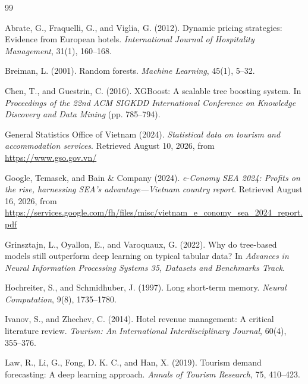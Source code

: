 \renewcommand{\bibname}{REFERENCES}

\begin{singlespace}
\begin{thebibliography}{99}
\setlength{\itemsep}{6pt}

Abrate, G., Fraquelli, G., and Viglia, G. (2012). Dynamic pricing strategies: Evidence from European hotels. \textit{International Journal of Hospitality Management}, 31(1), 160--168.

Breiman, L. (2001). Random forests. \textit{Machine Learning}, 45(1), 5--32.

Chen, T., and Guestrin, C. (2016). XGBoost: A scalable tree boosting system. In \textit{Proceedings of the 22nd ACM SIGKDD International Conference on Knowledge Discovery and Data Mining} (pp. 785--794).

General Statistics Office of Vietnam (2024). \textit{Statistical data on tourism and accommodation services}. Retrieved August 10, 2026, from \url{https://www.gso.gov.vn/}

Google, Temasek, and Bain \& Company (2024). \textit{e-Conomy SEA 2024: Profits on the rise, harnessing SEA's advantage---Vietnam country report}. Retrieved August 16, 2026, from \url{https://services.google.com/fh/files/misc/vietnam_e_conomy_sea_2024_report.pdf}

Grinsztajn, L., Oyallon, E., and Varoquaux, G. (2022). Why do tree-based models still outperform deep learning on typical tabular data? In \textit{Advances in Neural Information Processing Systems 35, Datasets and Benchmarks Track}.

Hochreiter, S., and Schmidhuber, J. (1997). Long short-term memory. \textit{Neural Computation}, 9(8), 1735--1780.

Ivanov, S., and Zhechev, C. (2014). Hotel revenue management: A critical literature review. \textit{Tourism: An International Interdisciplinary Journal}, 60(4), 355--376.

Law, R., Li, G., Fong, D. K. C., and Han, X. (2019). Tourism demand forecasting: A deep learning approach. \textit{Annals of Tourism Research}, 75, 410--423.


\end{thebibliography}
\end{singlespace}
